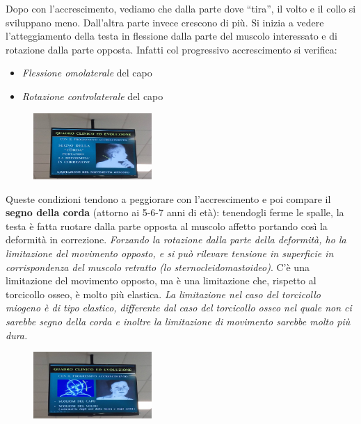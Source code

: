 Dopo con l'accrescimento, vediamo che dalla parte dove ``tira'', il volto e il collo si sviluppano meno. Dall'altra parte invece crescono di più. Si inizia a vedere l'atteggiamento della testa in flessione dalla parte del muscolo interessato e di rotazione dalla parte opposta.
Infatti col progressivo accrescimento si verifica:

\begin{itemize}
\item
  \emph{Flessione omolaterale} del capo
\item
  \emph{Rotazione controlaterale} del capo
\end{itemize}

\begin{figure}[!ht]
\centering
\includegraphics[width=0.4\textwidth]{013/image25.jpeg}
\end{figure}

Queste condizioni tendono a peggiorare con l'accrescimento e poi compare il \textbf{segno della corda} (attorno ai 5-6-7 anni di età): tenendogli ferme le spalle, la testa è fatta ruotare dalla parte opposta al muscolo affetto portando così la deformità in correzione. \emph{Forzando la rotazione dalla parte della deformità, ho la limitazione del movimento opposto, e si può rilevare tensione in superficie in corrispondenza del muscolo retratto (lo sternocleidomastoideo)}. C'è una limitazione del movimento opposto, ma è una limitazione che, rispetto al torcicollo
osseo, è molto più elastica. \emph{La limitazione nel caso del torcicollo miogeno è di tipo elastico, differente dal caso del torcicollo osseo nel quale non ci sarebbe segno della corda e inoltre la limitazione di movimento sarebbe molto più dura.}

\begin{figure}[!ht]
\centering
\includegraphics[width=0.4\textwidth]{013/image26.jpeg}
\end{figure}

